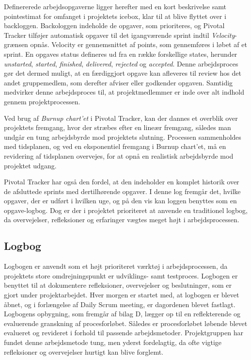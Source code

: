 	Definererede arbejdsopgaverne ligger herefter med en kort beskrivelse samt pointestimat for omfanget i projektets icebox, klar til at blive flyttet over i backloggen. Backologgen indeholde de opgaver, som prioriteres, og Pivotal Tracker tilføjer automatisk opgaver til det igangværende sprint indtil \textit{Velocity}-grænsen opnås. Velocity er gennemsnittet af points, som gennemføres i løbet af et sprint. En opgaves status defineres ud fra en række forskellige states, herunder \textit{unstarted}, \textit{started}, \textit{finished}, \textit{delivered}, \textit{rejected} og \textit{accepted}. Denne arbejdsproces gør det dermed muligt, at en færdiggjort opgave kan afleveres til review hos det andet gruppemedlem, som derefter afviser eller godkender opgaven. Samtidig medvirker denne arbejdsproces til, at projektmedlemmer er inde over alt indhold gennem projektprocessen.     
	
	Ved brug af \textit{Burnup chart'et} i Pivotal Tracker, kan der dannes et overblik over projektets fremgang, hvor der stræbes efter en lineær fremgang, således man undgår en tung arbejdsbyrde mod projektets slutning. Processen sammenholdes med tidsplanen, og ved en eksponentiel fremgang i Burnup chart'et, må en revidering af tidsplanen overvejes, for at opnå en realistisk arbejdsbyrde mod projektet udgang.  
	
	Pivotal Tracker har også den fordel, at den indeholder en komplet historik over de afsluttede sprints med dertilhørende opgaver. I denne log fremgår det, hvilke opgaver, der er udført i hvilken uge, og på den vis kan loggen benyttes som en opgave-logbog. Dog er der i projektet prioriteret at anvende en traditionel logbog, da overvejelser, refleksioner og erfaringer vægtes meget højt i arbejdsprocessen.      		
	
	\subsection{Logbog}
	Logbogen er anvendt som et højt prioriteret værktøj i arbejdsprocessen, da projektets store omdrejningspunkt er udviklings- samt testproces. Logbogen er benyttet til at dokumentere refleksioner, overvejelser og beslutninger, som er gjort under projektarbejdet. Hver morgen er startet med, at logbogen er blevet åbnet, og i forlængelse af Daily Scrum meeting, er dagordenen blevet  fastlagt. Logbogens opbygning, som fremgår af bilag D, lægger op til en reflekterende og evaluerende granskning af procesforløbet. Således er procesforløbet løbende blevet evalueret og revideret i forhold til passende arbejdsmetoder. Projektgruppen har fundet denne arbejdsmetode tung, men yderst fordelagtig, da ofte vigtige refleksioner og overvejelser hurtigt kan blive forglemt. 

